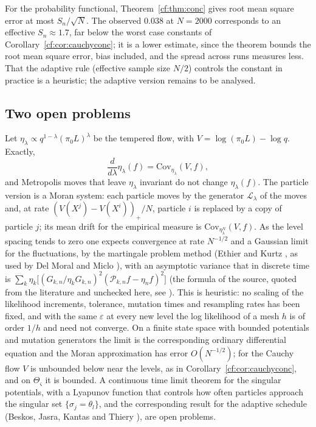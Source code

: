 For the probability functional, Theorem~\ref{cf:thm:conc} gives root mean square error at most $S_n/\sqrt N$. The observed $0.038$ at $N=2000$ corresponds to an effective $S_n\approx1.7$, far below the worst case constants of Corollary~\ref{cf:cor:cauchyconc}; it is a lower estimate, since the theorem bounds the root mean square error, bias included, and the spread across runs measures less. That the adaptive rule (effective sample size $N/2$) controls the constant in practice is a heuristic; the adaptive version remains to be analysed.

\subsection{Two open problems}

\begin{remark}\label{cf:rem:levellimit}
Let $\eta_\lambda\propto q^{1-\lambda}(\pi_0L)^\lambda$ be the tempered flow, with $V=\log(\pi_0L)-\log q$. Exactly,
\[
\frac{d}{d\lambda}\eta_\lambda(f)=\mathrm{Cov}_{\eta_\lambda}(V,f),
\]
and Metropolis moves that leave $\eta_\lambda$ invariant do not change $\eta_\lambda(f)$. The particle version is a Moran system: each particle moves by the generator $\mathcal L_\lambda$ of the moves and, at rate $(V(X^j)-V(X^i))_+/N$, particle $i$ is replaced by a copy of particle $j$; its mean drift for the empirical measure is $\mathrm{Cov}_{\eta_\lambda^N}(V,f)$. As the level spacing tends to zero one expects convergence at rate $N^{-1/2}$ and a Gaussian limit for the fluctuations, by the martingale problem method (Ethier and Kurtz \cite{EK86}, as used by Del Moral and Miclo \cite{DM00}), with an asymptotic variance that in discrete time is $\sum_k\eta_k\bigl[(G_{k,n}/\eta_kG_{k,n})^2(\mathcal P_{k,n}f-\eta_nf)^2\bigr]$ (the formula of the source, quoted from the literature and unchecked here, see \cite{DelMoral04}). This is heuristic: no scaling of the likelihood increments, tolerance, mutation times and resampling rates has been fixed, and with the same $\varepsilon$ at every new level the log likelihood of a mesh $h$ is of order $1/h$ and need not converge. On a finite state space with bounded potentials and mutation generators the limit is the corresponding ordinary differential equation and the Moran approximation has error $O(N^{-1/2})$; for the Cauchy flow $V$ is unbounded below near the levels, as in Corollary~\ref{cf:cor:cauchyconc}, and on $\Theta_\varsigma$ it is bounded. A continuous time limit theorem for the singular potentials, with a Lyapunov function that controls how often particles approach the singular set $\{\sigma_j=\theta_l\}$, and the corresponding result for the adaptive schedule (Beskos, Jasra, Kantas and Thiery \cite{BJKT16}), are open problems.
\end{remark}

